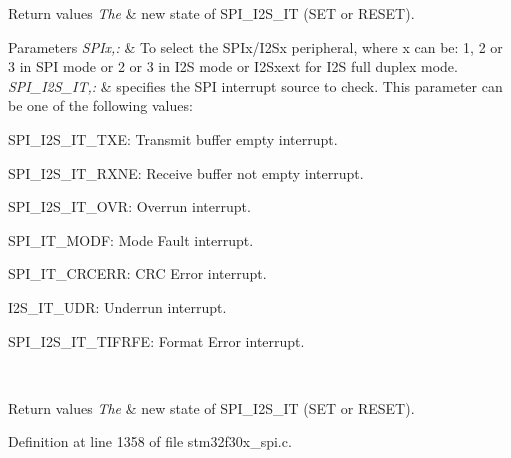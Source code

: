 \begin{DoxyRetVals}{Return values}
{\em The} & new state of S\-P\-I\-\_\-\-I2\-S\-\_\-\-I\-T (S\-E\-T or R\-E\-S\-E\-T).\\
\hline
\end{DoxyRetVals}

\begin{DoxyParams}{Parameters}
{\em S\-P\-Ix,\-:} & To select the S\-P\-Ix/\-I2\-Sx peripheral, where x can be\-: 1, 2 or 3 in S\-P\-I mode or 2 or 3 in I2\-S mode or I2\-Sxext for I2\-S full duplex mode. \\
\hline
{\em S\-P\-I\-\_\-\-I2\-S\-\_\-\-I\-T,\-:} & specifies the S\-P\-I interrupt source to check. This parameter can be one of the following values\-: \begin{DoxyItemize}
\item S\-P\-I\-\_\-\-I2\-S\-\_\-\-I\-T\-\_\-\-T\-X\-E\-: Transmit buffer empty interrupt. \item S\-P\-I\-\_\-\-I2\-S\-\_\-\-I\-T\-\_\-\-R\-X\-N\-E\-: Receive buffer not empty interrupt. \item S\-P\-I\-\_\-\-I2\-S\-\_\-\-I\-T\-\_\-\-O\-V\-R\-: Overrun interrupt. \item S\-P\-I\-\_\-\-I\-T\-\_\-\-M\-O\-D\-F\-: Mode Fault interrupt. \item S\-P\-I\-\_\-\-I\-T\-\_\-\-C\-R\-C\-E\-R\-R\-: C\-R\-C Error interrupt. \item I2\-S\-\_\-\-I\-T\-\_\-\-U\-D\-R\-: Underrun interrupt. \item S\-P\-I\-\_\-\-I2\-S\-\_\-\-I\-T\-\_\-\-T\-I\-F\-R\-F\-E\-: Format Error interrupt. \end{DoxyItemize}
\\
\hline
\end{DoxyParams}

\begin{DoxyRetVals}{Return values}
{\em The} & new state of S\-P\-I\-\_\-\-I2\-S\-\_\-\-I\-T (S\-E\-T or R\-E\-S\-E\-T). \\
\hline
\end{DoxyRetVals}


Definition at line 1358 of file stm32f30x\-\_\-spi.\-c.

